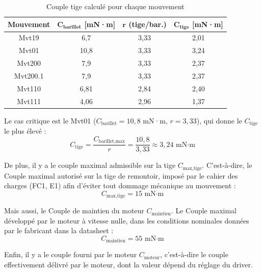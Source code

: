 \begin{table}[H]
  \centering
  \caption{Couple tige calculé pour chaque mouvement}
  \label{tab:couple_tige}
  \begin{tabular}{|c|c|c|c|}
    \hline
    \textbf{Mouvement} & $\boldsymbol{C_{\text{barillet}}}$ \textbf{[mN·m]} & $\boldsymbol{r}$ \textbf{(tige/bar.)} & $\boldsymbol{C_{\text{tige}}}$ \textbf{[mN·m]} \\
    \hline
    Mvt19    & 6,7  & 3,33 & 2,01 \\
    Mvt01    & 10,8 & 3,33 & 3,24 \\
    Mvt200   & 7,9  & 3,33 & 2,37 \\
    Mvt200.1 & 7,9  & 3,33 & 2,37 \\
    Mvt110   & 6,81 & 2,84 & 2,40 \\
    Mvt111   & 4,06 & 2,96 & 1,37 \\
    \hline
  \end{tabular}
\end{table}

Le cas critique est le Mvt01 ($C_{\text{barillet}} = 10{,}8$ mN·m, $r = 3{,}33$), qui donne le $C_{\text{tige}}$ le plus élevé :
\begin{equation}
    C_{\text{tige}} = \frac{C_{\text{barillet,max}}}{r}
    = \frac{10{,}8}{3{,}33}
    \approx 3{,}24 \text{ mN·m}
    \label{eq:couple_tige_calc}
\end{equation}

De plus, il y a le couple maximal admissible sur la tige $C_{\text{max,tige}}$. C'est-à-dire, le Couple maximal autorisé sur la tige de remontoir, imposé par le cahier des charges (FC1, E1) afin d'éviter tout dommage mécanique au mouvement :
\begin{equation}
    C_{\text{max,tige}} = 15 \text{ mN·m}
    \label{eq:couple_max_tige}
\end{equation}

Mais aussi, le Couple de maintien du moteur $C_{\text{maintien}}$. Le Couple maximal développé par le moteur à vitesse nulle, dans les conditions nominales données par le fabricant dans la datasheet :
\begin{equation}
    C_{\text{maintien}} = 55 \text{ mN·m}
    \label{eq:couple_maintien_moteur}
\end{equation}

Enfin, il y a le couple fourni par le moteur $C_{\text{moteur}}$, c'est-à-dire
le couple effectivement délivré par le moteur, dont la valeur dépend du
réglage du driver.

